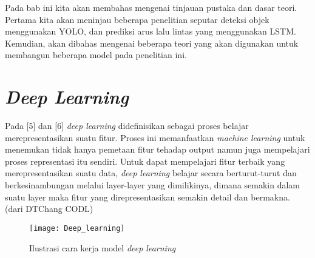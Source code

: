 \documentclass[../thesis.tex]{subfiles}
\begin{document}
   

Pada bab ini kita akan membahas mengenai tinjauan pustaka dan dasar teori. Pertama kita akan meninjau beberapa penelitian seputar deteksi objek menggunakan YOLO, dan prediksi arus lalu lintas yang menggunakan LSTM.
Kemudian, akan dibahas mengenai beberapa teori yang akan digunakan untuk membangun beberapa model pada penelitian ini.

\section{\textit{Deep Learning}}
Pada [5] dan [6] \textit{deep learning} didefinisikan sebagai proses belajar merepresentasikan suatu fitur. Proses ini memanfaatkan \textit{machine learning} untuk menemukan tidak hanya pemetaan fitur tehadap output namun juga mempelajari proses representasi itu sendiri.
Untuk dapat mempelajari fitur terbaik yang merepresentasikan suatu data, \textit{deep learning} belajar secara berturut-turut dan berkesinambungan melalui layer-layer yang dimilikinya, dimana semakin dalam suatu layer maka fitur yang direpresentasikan semakin detail dan bermakna.
(dari DTChang CODL)

\begin{figure}
	\centering
	\texttt{[image: Deep\_learning]}
	\caption{Ilustrasi cara kerja model \textit{deep learning}}
	\label{Dl_model}
\end{figure}
\end{document}
